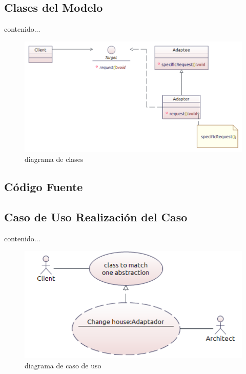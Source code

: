 \subsection{Clases  del Modelo}
contenido...
\begin{figure}[th!]
	\centering
	\includegraphics[width=0.7\linewidth]{arquitectura_diseno/imgs/MCL_Adaptador}
	\caption{diagrama de clases}
\end{figure}
\newpage
\subsection{Código Fuente}
%
%
%
%
\newpage
\subsection{Caso de Uso Realización del Caso}
contenido...
\begin{figure}[th!]
	\centering
	\includegraphics[width=0.7\linewidth]{arquitectura_diseno/imgs/CCU_Adaptador}
	\caption{diagrama de caso de uso}
\end{figure}
\newpage

